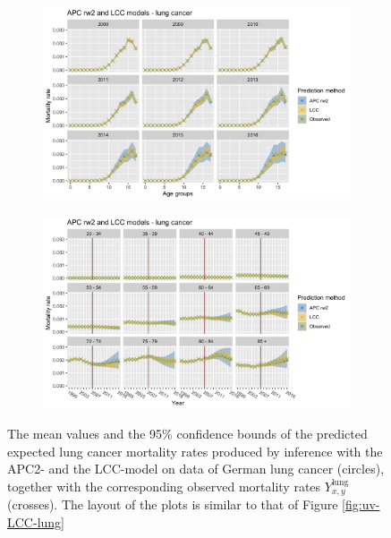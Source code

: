 \begin{figure}[h!]
    \centering
    \begin{subfigure}[b]{.75\linewidth}
        \includegraphics[width=\linewidth]{real-data/real-data-univariate/Figures/univariate-comparison-by-age-lung.png}
        \label{fig:uv-comparison-lung-top}
    \end{subfigure}
    
    \begin{subfigure}[b]{.75\linewidth}
        \includegraphics[width=\linewidth]{real-data/real-data-univariate/Figures/univariate-comparison-by-period-lung.png}
        \label{fig:uv-comparison-lung-bottom}
    \end{subfigure}
    \caption{The mean values and the 95\% confidence bounds of the predicted expected lung cancer mortality rates produced by inference with the APC2- and the LCC-model on data of German lung cancer (circles), together with the corresponding observed mortality rates $Y_{x,y}^{\text{lung}}$ (crosses). The layout of the plots is similar to that of Figure \ref{fig:uv-LCC-lung}}
    \label{fig:uv-comparison-lung}
\end{figure}

